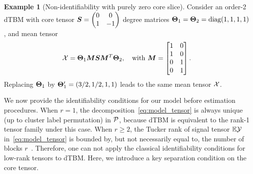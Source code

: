 \documentclass[journal]{IEEEtran}
\theoremstyle{definition}
\theoremstyle{definition}
\newtheorem{example}{Example}
\begin{document}
  \begin{example}[Non-identifiability with purely zero core slice]\label{example:c3} 
 Consider an order-2 dTBM with core tensor $\bm S = \begin{pmatrix} 0 & 0\\
    1 & -1
    \end{pmatrix}$ degree matrices $ \boldsymbol{\Theta}_1 =\boldsymbol{\Theta}_2= \text{diag}(1,1,1,1)$, and mean tensor 
    \begin{equation}
        \mathcal{X} =  \boldsymbol{\Theta}_1 \bm M \bm S   \bm M^T \boldsymbol{\Theta}_2, \quad \text{with } \bm M = \begin{bmatrix} 1 & 0 \\
        1 & 0 \\
        0 & 1 \\
        0 & 1 \\
        \end{bmatrix}.
    \end{equation}
Replacing $\boldsymbol{\Theta}_1$ by $\boldsymbol{\Theta}'_1 = (3/2, 1/2, 1,1)$ leads to the same mean tensor $\mathcal{X}$. 
\end{example}

 \begin{table}[th]
    \centering
    \caption{Parameter space comparison between previous work with our assumption.}
    \label{tab:para}
\end{table}

We now provide the identifiability conditions for our model before estimation procedures. When $r=1$, the decomposition~\eqref{eq:model_tensor} is always unique (up to cluster label permutation) in $\mathcal{P}$, because dTBM is equivalent to the rank-1 tensor family under this case. When $r\geq 2$, the Tucker rank of signal tensor $\mathbb{E}\mathcal{Y}$ in~\eqref{eq:model_tensor} is bounded by, but not necessarily equal to, the number of blocks $r$~\citep{wang2019multiway}. Therefore, one can not apply the classical identifiability conditions for low-rank tensors to dTBM. Here, we introduce a key separation condition on the core tensor. 
\end{document}
